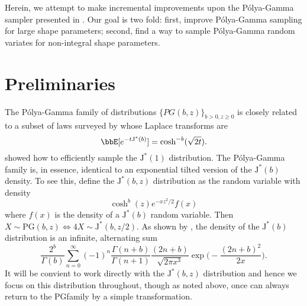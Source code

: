 \documentclass[12pt]{article}
\newcommand{\Polya}{P\'{o}lya}
\newcommand{\JJ}{\text{J}^*}
\newcommand{\PG}{\mbox{PG}}
\begin{document}
Herein, we attempt to make incremental improvements upon the \Polya-Gamma
sampler presented in \cite{polson-etal-2013}.  Our goal is two fold: first,
improve \Polya-Gamma sampling for large shape parameters; second, find a way to
sample \Polya-Gamma random variates for non-integral shape parameters.

\section{Preliminaries}

The \Polya-Gamma family of distributions $\{PG(b,z)\}_{b>0, z\geq 0}$ is closely
related to a subset of laws surveyed by \cite{biane-etal-2001} whose Laplace
transforms are 
\[
\bbE[ e^{-t \JJ(b)} ] = \cosh^{-b} (\sqrt{2 t}).
\]
\cite{devroye-2009} showed how to efficiently sample the $\JJ(1)$ distribution.
The \Polya-Gamma family is, in essence, identical to an exponential tilted
version of the $\JJ(b)$ density.  To see this, define the $\JJ(b,z)$
distribution as the random variable with density
\[
\cosh^b(z) e^{- x z^2 / 2} f(x)
\]
where $f(x)$ is the density of a $\JJ(b)$ random variable.  Then $X \sim
\PG(b,z) \iff 4 X \sim \JJ(b,z/2)$.  As shown by \cite{biane-etal-2001}, the
density of the $\JJ(b)$ distribution is an infinite, alternating sum
\begin{equation}
\label{eqn:igamma-rep}
\frac{2^b}{\Gamma(b)} \sum_{n=0}^{\infty} (-1)^n \frac{\Gamma(n+b)}{\Gamma(n+1)} 
\frac{(2n+b)}{\sqrt{2 \pi x^3}} \exp \Big( - \frac{(2n+b)^2}{2 x} \Big).
\end{equation}
It will be convient to work directly with the $\JJ(b,z)$ distribution and hence
we focus on this distribution throughout, though as noted above, once can always
return to the \PG family by a simple transformation.
\end{document}
